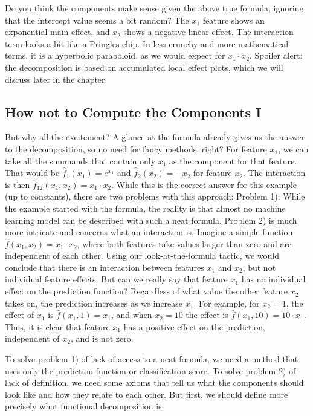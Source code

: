 \documentclass[
  10pt,
]{scrbook}
\begin{document}
Do you think the components make sense given the above true formula, ignoring that the intercept value seems a bit random?
The \(x_1\) feature shows an exponential main effect, and \(x_2\) shows a negative linear effect.
The interaction term looks a bit like a Pringles chip.
In less crunchy and more mathematical terms, it is a hyperbolic paraboloid, as we would expect for \(x_1 \cdot x_2\).
Spoiler alert: the decomposition is based on accumulated local effect plots, which we will discuss later in the chapter.

\hypertarget{how-not-to-compute-the-components-i}{%
\subsection{How not to Compute the Components I}\label{how-not-to-compute-the-components-i}}

But why all the excitement?
A glance at the formula already gives us the answer to the decomposition, so no need for fancy methods, right?
For feature \(x_1\), we can take all the summands that contain only \(x_1\) as the component for that feature.
That would be \(\hat{f}_1(x_1) = e^{x_1}\) and \(\hat{f}_2(x_2) = -x_2\) for feature \(x_2\).
The interaction is then \(\hat{f}_{12}(x_{1},x_{2}) = x_1 \cdot x_2\).
While this is the correct answer for this example (up to constants), there are two problems with this approach:
Problem 1): While the example started with the formula, the reality is that almost no machine learning model can be described with such a neat formula.
Problem 2) is much more intricate and concerns what an interaction is.
Imagine a simple function \(\hat{f}(x_1,x_2) = x_1 \cdot x_2\), where both features take values larger than zero and are independent of each other.
Using our look-at-the-formula tactic, we would conclude that there is an interaction between features \(x_1\) and \(x_2\), but not individual feature effects.
But can we really say that feature \(x_1\) has no individual effect on the prediction function?
Regardless of what value the other feature \(x_2\) takes on, the prediction increases as we increase \(x_1\).
For example, for \(x_2 = 1\), the effect of \(x_1\) is \(\hat{f}(x_1, 1) = x_1\), and when \(x_2 = 10\) the effect is \(\hat{f}(x_1, 10) = 10 \cdot x_1\).
Thus, it is clear that feature \(x_1\) has a positive effect on the prediction, independent of \(x_2\), and is not zero.

To solve problem 1) of lack of access to a neat formula, we need a method that uses only the prediction function or classification score.
To solve problem 2) of lack of definition, we need some axioms that tell us what the components should look like and how they relate to each other.
But first, we should define more precisely what functional decomposition is.
\end{document}
